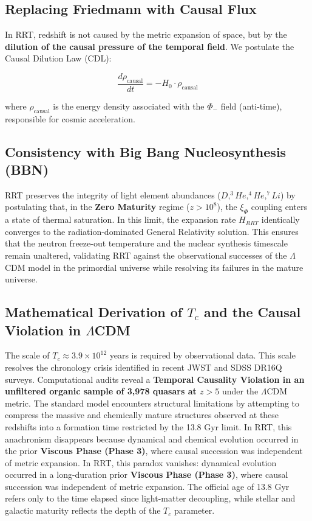 \documentclass[12pt, a4paper]{article}
\begin{document}
\subsection{Replacing Friedmann with Causal Flux}

In RRT, redshift is not caused by the metric expansion of space, but by the \textbf{dilution of the causal pressure of the temporal field}. We postulate the Causal Dilution Law (CDL):

\[
\frac{d\rho_{\text{causal}}}{dt} = -H_0 \cdot \rho_{\text{causal}}
\]

where \(\rho_{\text{causal}}\) is the energy density associated with the \(\Phi_{-}\) field (anti-time), responsible for cosmic acceleration.

\subsection{Consistency with Big Bang Nucleosynthesis (BBN)}
RRT preserves the integrity of light element abundances ($D, ^3He, ^4He, ^7Li$) by postulating that, in the \textbf{Zero Maturity} regime ($z > 10^8$), the $\xi_\Phi$ coupling enters a state of thermal saturation. In this limit, the expansion rate $H_{RRT}$ identically converges to the radiation-dominated General Relativity solution. This ensures that the neutron freeze-out temperature and the nuclear synthesis timescale remain unaltered, validating RRT against the observational successes of the $\Lambda$CDM model in the primordial universe while resolving its failures in the mature universe.

\subsection{Mathematical Derivation of \texorpdfstring{$T_c$}{Tc} and the Causal Violation in \texorpdfstring{$\Lambda$CDM}{LambdaCDM}}

The scale of $T_c \approx 3.9 \times 10^{12}$ years is required by observational data. This scale resolves the chronology crisis identified in recent JWST and SDSS DR16Q surveys. Computational audits reveal a \textbf{Temporal Causality Violation in an unfiltered organic sample of 3,978 quasars at $z > 5$} under the $\Lambda$CDM metric. The standard model encounters structural limitations by attempting to compress the massive and chemically mature structures observed at these redshifts into a formation time restricted by the 13.8 Gyr limit. In RRT, this anachronism disappears because dynamical and chemical evolution occurred in the prior \textbf{Viscous Phase (Phase 3)}, where causal succession was independent of metric expansion. In RRT, this paradox vanishes: dynamical evolution occurred in a long-duration prior \textbf{Viscous Phase (Phase 3)}, where causal succession was independent of metric expansion. The official age of 13.8 Gyr refers only to the time elapsed since light-matter decoupling, while stellar and galactic maturity reflects the depth of the $T_c$ parameter.
\end{document}
